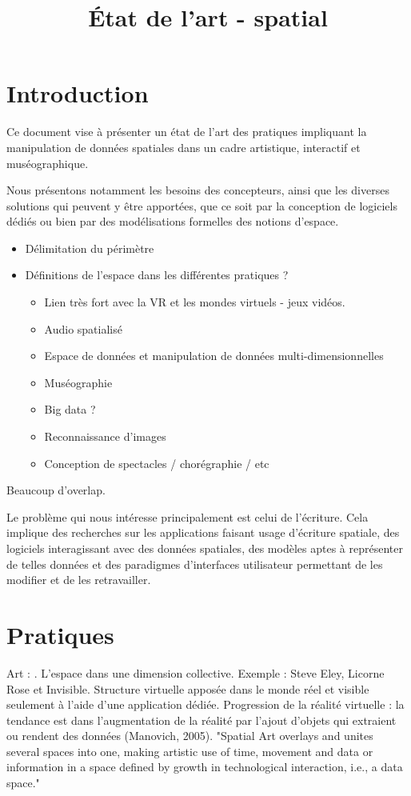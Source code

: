 \documentclass[french,12pt]{article}
\title{État de l'art - spatial}
\begin{document}
\maketitle
\tableofcontents

\section{Introduction}
Ce document vise à présenter un état de l'art des pratiques impliquant la manipulation de 
données spatiales dans un cadre artistique, interactif et muséographique.

Nous présentons notamment les besoins des concepteurs, ainsi que les diverses solutions qui 
peuvent y être apportées, que ce soit par la conception de logiciels dédiés ou bien 
par des modélisations formelles des notions d'espace.
 
\begin{itemize}
    
\item Délimitation du périmètre
 
\item Définitions de l'espace dans les différentes pratiques ?
 
 \begin{itemize}
  \item Lien très fort avec la VR et les mondes virtuels - jeux vidéos.
  \item Audio spatialisé
  \item Espace de données et manipulation de données multi-dimensionnelles
  \item Muséographie
  \item Big data ?
  \item Reconnaissance d'images 
  \item Conception de spectacles / chorégraphie / etc
\end{itemize}

\end{itemize}

Beaucoup d'overlap.
  
Le problème qui nous intéresse principalement est celui de l'écriture. Cela implique des recherches sur les applications faisant usage d'écriture spatiale, des logiciels interagissant avec des données spatiales, des modèles aptes à représenter de telles données et des paradigmes d'interfaces utilisateur permettant de les modifier et de les retravailler. 


\newpage
\section{Pratiques}
Art : \cite{lodi_spatial_2014}. L'espace dans une dimension collective. Exemple : Steve Eley, Licorne Rose et Invisible. Structure virtuelle apposée dans le monde réel et visible seulement à l'aide d'une application dédiée. Progression de la réalité virtuelle : la tendance est dans l'augmentation de la réalité par l'ajout d'objets qui extraient ou rendent des données (Manovich, 2005). "Spatial Art overlays and unites several spaces into one, making artistic use of time, movement and data or information in a space defined by growth in technological interaction, i.e., a data space."
\end{document}
